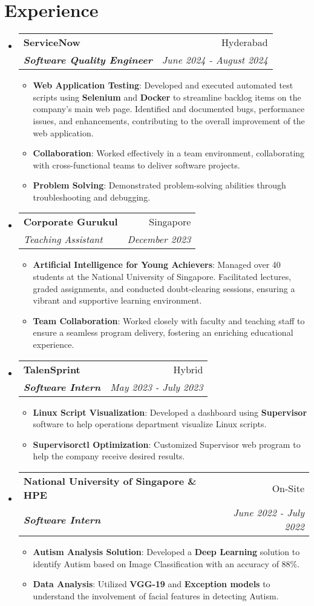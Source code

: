 \documentclass[a4paper,20pt]{article}
\makeatletter
\newcommand{\resumeItem}[2]{
  \item\small{
    \textbf{#1}{: #2 \vspace{-2pt}}
  }
}
\newcommand{\resumeSubheading}[4]{
  \vspace{-1pt}\item
    \begin{tabular*}{0.97\textwidth}{l@{\extracolsep{\fill}}r}
      \textbf{#1} & #2 \\
      \textit{#3} & \textit{#4} \\
    \end{tabular*}\vspace{-5pt}
}
\newcommand{\resumeSubHeadingListStart}{\begin{itemize}[leftmargin=*]}
\newcommand{\resumeSubHeadingListEnd}{\end{itemize}}
\newcommand{\resumeItemListStart}{\begin{itemize}}
\newcommand{\resumeItemListEnd}{\end{itemize}\vspace{-5pt}}
\makeatother
\begin{document}
\section{Experience}
  \resumeSubHeadingListStart
    \resumeSubheading
		{ServiceNow}{Hyderabad}
		{\textbf{Software Quality Engineer}}{June 2024 -  August 2024}
		\resumeItemListStart
        \resumeItem{Web Application Testing}
          {Developed and executed automated test scripts using \textbf{Selenium} and \textbf{Docker} to streamline backlog items on the company’s main web page. Identified and documented bugs, performance issues, and enhancements, contributing to the overall improvement of the web application.}
        \resumeItem{Collaboration}{Worked effectively in a team environment, collaborating with cross-functional teams to deliver software projects.}
        \resumeItem{Problem Solving}{Demonstrated problem-solving abilities through troubleshooting and debugging.}
    \resumeItemListEnd
\vspace{-2pt}
    \resumeSubheading{Corporate Gurukul}{Singapore}
    {Teaching Assistant}{December 2023}
    \resumeItemListStart
        \resumeItem{Artificial Intelligence for Young Achievers}
          {Managed over 40 students at the National University of Singapore. Facilitated lectures, graded assignments, and conducted doubt-clearing sessions, ensuring a vibrant and supportive learning environment.}
          \resumeItem{Team Collaboration}{Worked closely with faculty and teaching staff to ensure a seamless program delivery, fostering an enriching educational experience.}
      \resumeItemListEnd
\vspace{-2pt}
    \resumeSubheading
		{TalenSprint }{Hybrid}
		{\textbf{Software Intern}}{May 2023 -  July 2023}
		\resumeItemListStart
        \resumeItem{Linux Script Visualization}
          {Developed a dashboard using \textbf{Supervisor} software to help operations department visualize Linux scripts.}
        \resumeItem{Supervisorctl Optimization}{Customized Supervisor web program to help the company receive desired results.}
		\resumeItemListEnd
\vspace{-2pt}
    \resumeSubheading
		{National University of Singapore \& HPE }{On-Site}
		{\textbf{Software Intern}}{June 2022 -  July 2022}
		\resumeItemListStart
        \resumeItem{Autism Analysis Solution}
          {Developed a \textbf{Deep Learning} solution to identify Autism based on Image Classification with an accuracy of 88\%.}
        \resumeItem{Data Analysis}{Utilized \textbf{VGG-19} and \textbf{Exception models} to understand the involvement of facial features in detecting Autism.}
		\resumeItemListEnd
\resumeSubHeadingListEnd
\vspace{-2pt}
\end{document}
